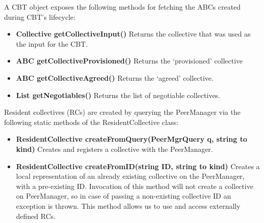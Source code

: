 A CBT object exposes the following methods for fetching the ABCs created during CBT's lifecycle:
\begin{itemize}
\item {\bf Collective getCollectiveInput()} Returns the collective that was used as the input for the CBT.
\item {\bf ABC getCollectiveProvisioned()} Returns the `provisioned' collective
\item {\bf ABC getCollectiveAgreed()} Returns the `agreed' collective.
\item {\bf List getNegotiables()} Returns the list of negotiable collectives.
\end{itemize}
Resident collectives (RCs) are created by querying the PeerManager via the following static methods of the ResidentCollective class:
\begin{itemize}
\item {\bf ResidentCollective createFromQuery(PeerMgrQuery q, string to kind)} Creates and registers a collective with the PeerManager. %
\item {\bf ResidentCollective createFromID(string ID, string to kind)} Creates a local representation of an already existing collective on the PeerManager, with a pre-existing ID. Invocation of this method will not create a collective on PeerManager, so in case of passing a non-existing collective ID an exception is thrown. This method allows us to use and access externally defined RCs. %
\end{itemize}
